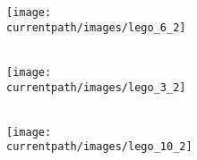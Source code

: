 \begin{activite}
        \partie[]
        \begin{minipage}{0.36\linewidth}
            \begin{center}
                \texttt{[image: \\currentpath/images/lego\_6\_2]}\\ [2.5mm]
                \makebox[\linewidth]{\dotfill} \\ [2.5mm]
                \makebox[\linewidth]{\dotfill} 
            \end{center}
        \end{minipage}
        \hspace{15mm}
        \begin{minipage}{0.3\linewidth}
            \begin{center}
                \texttt{[image: \\currentpath/images/lego\_3\_2]}\\ [2.5mm]
                \makebox[\linewidth]{\dotfill} \\ [2.5mm]
                \makebox[\linewidth]{\dotfill}
            \end{center}
        \end{minipage}
        \hspace{15mm}
        \begin{minipage}{0.3\linewidth}
            \begin{center}
                \texttt{[image: \\currentpath/images/lego\_10\_2]} \\ [2.5mm]
                \makebox[\linewidth]{\dotfill} \\ [2.5mm]
                \makebox[\linewidth]{\dotfill}
            \end{center}
        \end{minipage}


\end{activite}
